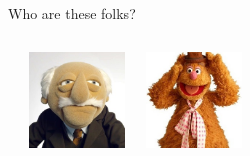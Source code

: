 \documentclass{beamer}\usepackage[]{graphicx}\usepackage[]{color}
\begin{document}
\begin{darkframes}
\begin{frame}{Who are these folks?}
\begin{columns}[onlytextwidth]
\begin{center}
      \end{center}
      \begin{center}
        \includegraphics[width=1in]{waldorf} \\
      \end{center}
      \begin{center}
        \includegraphics[width=1in]{fozziebear} \\
      \end{center}
  \end{columns}
\end{frame}


\end{darkframes}
\end{document}
